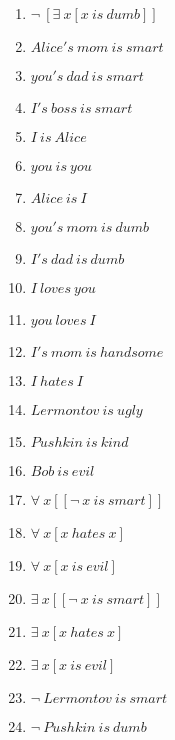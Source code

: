 \documentclass{article}
\begin{document}
\begin{enumerate}
\item $\neg \ [\exists \ x[x \ is \ dumb]]$

\item $Alice's \ mom \ is \ smart$

\item $you's \ dad \ is \ smart$

\item $I's \ boss \ is \ smart$

\item $I \ is \ Alice$

\item $you \ is \ you$

\item $Alice \ is \ I$

\item $you's \ mom \ is \ dumb$

\item $I's \ dad \ is \ dumb$

\item $I \ loves \ you$

\item $you \ loves \ I$

\item $I's \ mom \ is \ handsome$

\item $I \ hates \ I$

\item $Lermontov \ is \ ugly$

\item $Pushkin \ is \ kind$

\item $Bob \ is \ evil$

\item $\forall \ x[[\neg \ x \ is \ smart]]$

\item $\forall \ x[x \ hates \ x]$

\item $\forall \ x[x \ is \ evil]$

\item $\exists \ x[[\neg \ x \ is \ smart]]$

\item $\exists \ x[x \ hates \ x]$

\item $\exists \ x[x \ is \ evil]$

\item $\neg \ Lermontov \ is \ smart$

\item $\neg \ Pushkin \ is \ dumb$


\end{enumerate}
\end{document}
